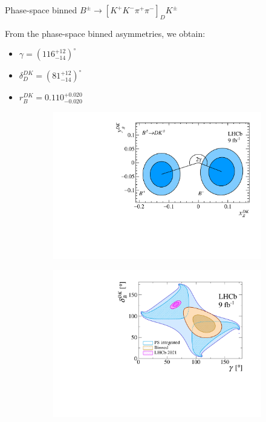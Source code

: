 \documentclass[xcolor={dvipsnames}]{beamer}
\begin{document}
\begin{frame}{Phase-space binned $B^\pm\to[K^+K^-\pi^+\pi^-]_DK^\pm$}
  \begin{center}
    \large From the phase-space binned asymmetries, we obtain:
  \end{center}
  \begin{itemize}
    \item{$\gamma = (116^{+12}_{-14})^\circ$}
    \item{$\delta_D^{DK} = (81^{+12}_{-14})^\circ$}
    \item{$r_B^{DK} = 0.110^{+0.020}_{-0.020}$}
  \end{itemize}
  \vspace{-0.2cm}
  \begin{figure}[htb]
    \centering
    \begin{subfigure}{0.5\textwidth}
      \includegraphics[width=1\textwidth]{Plots/B2DK_CP_Observables_Contours.pdf}
    \end{subfigure}%
    \begin{subfigure}{0.5\textwidth}
      \includegraphics[width=1\textwidth]{Plots/gammacharm_lhcb_KKpipi_GLW_KKpipi_GGSZ_lhcb_2020_beauty_and_charm_g_d_dk.pdf}

\end{subfigure}
\end{figure}
\end{frame}
\end{document}

